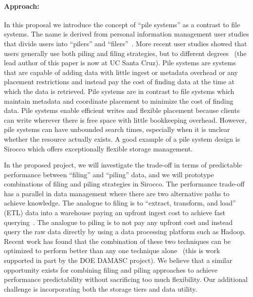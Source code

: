 \paragraph{Approach:} In this proposal we introduce the concept of ``pile systems'' as a contrast to file systems. The name
is derived from personal information management user studies that divide users into ``pilers'' and ``filers''~\cite{malone:tois83}. More recent user studies showed that users generally use both piling and filing strategies, but to different degrees~\cite{whittaker:tochi01} (the lead author of this paper is now at UC Santa Cruz). Pile systems are systems that are capable of adding data with little ingest or metadata overhead or any placement restrictions and instead pay the cost of finding data at the time at which the data is retrieved. Pile systems are in contrast to file systems which maintain metadata and coordinate placement to minimize the cost of finding data. Pile systems enable efficient writes and flexible placement because clients can write wherever there
is free space with little bookkeeping overhead. However, pile systems can have unbounded search times, especially when it is unclear whether the resource actually exists. A good example of a pile system design is Sirocco which offers exceptionally flexible storage management.


In the proposed project, we will investigate the trade-off in terms of predictable
performance between ``filing'' and ``piling'' data, and we will
prototype combinations of filing and piling strategies in Sirocco.
The performance trade-off has a
parallel in data management where there are two alternative paths to achieve
knowledge. The analogue to filing is  to ``extract, transform, and load'' (ETL)
data into a warehouse paying an upfront ingest cost to achieve fast 
querying~\cite{vassiliadis:ijdwm09}.
The analogue to piling is to not pay any upfront cost and instead query the
raw data directly by using a data processing platform such as Hadoop.  Recent
work has found that the combination of these two techniques can be optimized to
perform better than any one technique alone~\cite{lefevre:sigmod14a} (this is work supported in part by the DOE DAMASC project). We
believe that a similar opportunity exists for combining filing and piling
approaches to achieve performance predictability without sacrificing too much
flexibility. Our additional challenge is incorporating both the storage tiers
and data utility.

